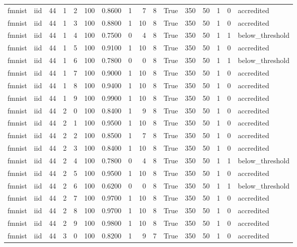\begin{tabular}{llrrrrrrrrrrrrrl}
fmnist & iid & 44 & 1 & 2 & 100 & 0.8600 & 1 & 7 & 8 & True & 350 & 50 & 1 & 0 & accredited \\
fmnist & iid & 44 & 1 & 3 & 100 & 0.8800 & 1 & 10 & 8 & True & 350 & 50 & 1 & 0 & accredited \\
fmnist & iid & 44 & 1 & 4 & 100 & 0.7500 & 0 & 4 & 8 & True & 350 & 50 & 1 & 1 & below\_threshold \\
fmnist & iid & 44 & 1 & 5 & 100 & 0.9100 & 1 & 10 & 8 & True & 350 & 50 & 1 & 0 & accredited \\
fmnist & iid & 44 & 1 & 6 & 100 & 0.7800 & 0 & 0 & 8 & True & 350 & 50 & 1 & 1 & below\_threshold \\
fmnist & iid & 44 & 1 & 7 & 100 & 0.9000 & 1 & 10 & 8 & True & 350 & 50 & 1 & 0 & accredited \\
fmnist & iid & 44 & 1 & 8 & 100 & 0.9400 & 1 & 10 & 8 & True & 350 & 50 & 1 & 0 & accredited \\
fmnist & iid & 44 & 1 & 9 & 100 & 0.9900 & 1 & 10 & 8 & True & 350 & 50 & 1 & 0 & accredited \\
fmnist & iid & 44 & 2 & 0 & 100 & 0.8400 & 1 & 9 & 8 & True & 350 & 50 & 1 & 0 & accredited \\
fmnist & iid & 44 & 2 & 1 & 100 & 0.9500 & 1 & 10 & 8 & True & 350 & 50 & 1 & 0 & accredited \\
fmnist & iid & 44 & 2 & 2 & 100 & 0.8500 & 1 & 7 & 8 & True & 350 & 50 & 1 & 0 & accredited \\
fmnist & iid & 44 & 2 & 3 & 100 & 0.8400 & 1 & 10 & 8 & True & 350 & 50 & 1 & 0 & accredited \\
fmnist & iid & 44 & 2 & 4 & 100 & 0.7800 & 0 & 4 & 8 & True & 350 & 50 & 1 & 1 & below\_threshold \\
fmnist & iid & 44 & 2 & 5 & 100 & 0.9500 & 1 & 10 & 8 & True & 350 & 50 & 1 & 0 & accredited \\
fmnist & iid & 44 & 2 & 6 & 100 & 0.6200 & 0 & 0 & 8 & True & 350 & 50 & 1 & 1 & below\_threshold \\
fmnist & iid & 44 & 2 & 7 & 100 & 0.9700 & 1 & 10 & 8 & True & 350 & 50 & 1 & 0 & accredited \\
fmnist & iid & 44 & 2 & 8 & 100 & 0.9700 & 1 & 10 & 8 & True & 350 & 50 & 1 & 0 & accredited \\
fmnist & iid & 44 & 2 & 9 & 100 & 0.9800 & 1 & 10 & 8 & True & 350 & 50 & 1 & 0 & accredited \\
fmnist & iid & 44 & 3 & 0 & 100 & 0.8200 & 1 & 9 & 7 & True & 350 & 50 & 1 & 0 & accredited \\

\end{tabular}
